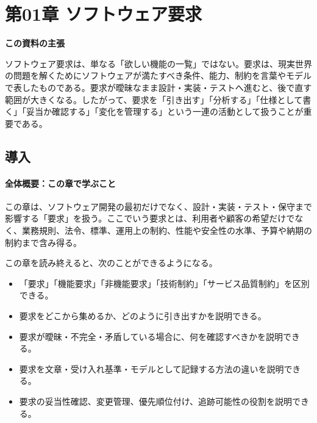 \section{第01章 ソフトウェア要求}
\noindent\textbf{この資料の主張}

ソフトウェア要求は、単なる「欲しい機能の一覧」ではない。要求は、現実世界の問題を解くためにソフトウェアが満たすべき条件、能力、制約を言葉やモデルで表したものである。要求が曖昧なまま設計・実装・テストへ進むと、後で直す範囲が大きくなる。したがって、要求を「引き出す」「分析する」「仕様として書く」「妥当か確認する」「変化を管理する」という一連の活動として扱うことが重要である。


\subsection{導入}

\paragraph{全体概要：この章で学ぶこと}

この章は、ソフトウェア開発の最初だけでなく、設計・実装・テスト・保守まで影響する「要求」を扱う。ここでいう要求とは、利用者や顧客の希望だけでなく、業務規則、法令、標準、運用上の制約、性能や安全性の水準、予算や納期の制約まで含み得る。

この章を読み終えると、次のことができるようになる。
\begin{itemize}
\item 「要求」「機能要求」「非機能要求」「技術制約」「サービス品質制約」を区別できる。
\item 要求をどこから集めるか、どのように引き出すかを説明できる。
\item 要求が曖昧・不完全・矛盾している場合に、何を確認すべきかを説明できる。
\item 要求を文章・受け入れ基準・モデルとして記録する方法の違いを説明できる。
\item 要求の妥当性確認、変更管理、優先順位付け、追跡可能性の役割を説明できる。
\end{itemize}

